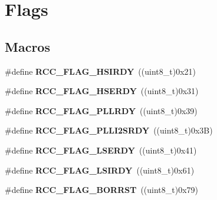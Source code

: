 \hypertarget{group___r_c_c___flag}{}\section{Flags}
\label{group___r_c_c___flag}
\subsection*{Macros}
\begin{DoxyCompactItemize}
\item 
\mbox{\label{group___r_c_c___flag_ga827d986723e7ce652fa733bb8184d216}} 
\#define {\bfseries R\+C\+C\+\_\+\+F\+L\+A\+G\+\_\+\+H\+S\+I\+R\+DY}~((uint8\+\_\+t)0x21)
\item 
\mbox{\label{group___r_c_c___flag_ga173edf47bec93cf269a0e8d0fec9997c}} 
\#define {\bfseries R\+C\+C\+\_\+\+F\+L\+A\+G\+\_\+\+H\+S\+E\+R\+DY}~((uint8\+\_\+t)0x31)
\item 
\mbox{\label{group___r_c_c___flag_gaf82d8afb18d9df75db1d6c08b9c50046}} 
\#define {\bfseries R\+C\+C\+\_\+\+F\+L\+A\+G\+\_\+\+P\+L\+L\+R\+DY}~((uint8\+\_\+t)0x39)
\item 
\mbox{\label{group___r_c_c___flag_ga31e67a9f19cf673acf196d19f443f3d5}} 
\#define {\bfseries R\+C\+C\+\_\+\+F\+L\+A\+G\+\_\+\+P\+L\+L\+I2\+S\+R\+DY}~((uint8\+\_\+t)0x3\+B)
\item 
\mbox{\label{group___r_c_c___flag_gac9fb963db446c16e46a18908f7fe1927}} 
\#define {\bfseries R\+C\+C\+\_\+\+F\+L\+A\+G\+\_\+\+L\+S\+E\+R\+DY}~((uint8\+\_\+t)0x41)
\item 
\mbox{\label{group___r_c_c___flag_ga8c5e4992314d347597621bfe7ab10d72}} 
\#define {\bfseries R\+C\+C\+\_\+\+F\+L\+A\+G\+\_\+\+L\+S\+I\+R\+DY}~((uint8\+\_\+t)0x61)
\item 
\mbox{\label{group___r_c_c___flag_ga23d5211abcdf0e397442ca534ca04bb4}} 
\#define {\bfseries R\+C\+C\+\_\+\+F\+L\+A\+G\+\_\+\+B\+O\+R\+R\+ST}~((uint8\+\_\+t)0x79)
\item 
\mbox{\label{group___r_c_c___flag_gabfc3ab5d4a8a94ec1c9f38794ce37ad6}} 

\end{DoxyCompactItemize}
